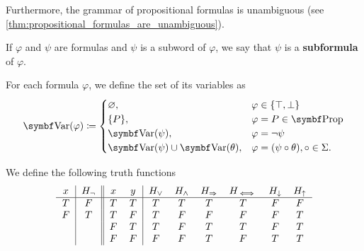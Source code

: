 \begin{definition}
  Furthermore, the grammar of propositional formulas is unambiguous (see \cref{thm:propositional_formulas_are_unambiguous}).

  If \( \varphi \) and \( \psi \) are formulas and \( \psi \) is a subword of \( \varphi \), we say that \( \psi \) is a \textbf{subformula} of \( \varphi \).

  For each formula \( \varphi \), we define the set of its variables as
  \begin{align*}
    \Bold{Var}(\varphi) \coloneqq \begin{cases}
      \varnothing,                              &\varphi \in \{ \top, \bot \} \\
      \{ P \},                                  &\varphi = P \in \Bold{Prop} \\
      \Bold{Var}(\psi),                         &\varphi = \neg \psi \\
      \Bold{Var}(\psi) \cup \Bold{Var}(\theta), &\varphi = (\psi \circ \theta), \circ \in \Sigma.
    \end{cases}
  \end{align*}
\end{definition}

\begin{definition}\label{def:truth_functions}
  We define the following truth functions
  \begin{equation*}
    \begin{tabular}{c | c || c c | c c c c c c}
      \( x \)    & \( H_\neg \) & \( x \)    & \( y \)    & \( H_\lor \) & \( H_\land \) & \( H_\Rightarrow \) & \( H_{\iff} \) & \( H_\downarrow \) & \( H_\uparrow \) \\
      \hline
      \( T \)    & \( F \)      & \( T \)    & \( T \)    & \( T \)      & \( T \)       & \( T \)          & \( T \)      & \( F \)            & \( F \)    \\
      \( F \)    & \( T \)      & \( T \)    & \( F \)    & \( T \)      & \( F \)       & \( F \)          & \( F \)      & \( F \)            & \( T \)    \\
             &          & \( F \)    & \( T \)    & \( T \)      & \( F \)       & \( T \)          & \( T \)      & \( F \)            & \( T \)    \\
             &          & \( F \)    & \( F \)    & \( F \)      & \( F \)       & \( T \)          & \( F \)      & \( T \)            & \( T \)
    \end{tabular}
  \end{equation*}
\end{definition}

